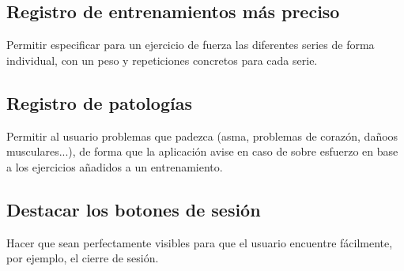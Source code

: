 \documentclass[a4paper]{article}
\begin{document}
	\subsection{Registro de entrenamientos más preciso}
	
	Permitir especificar para un ejercicio de fuerza las diferentes series de forma individual, con un peso y repeticiones concretos para cada serie.
	
	\subsection{Registro de patologías}
	
	Permitir al usuario problemas que padezca (asma, problemas de corazón, dañoos musculares...), de forma que la aplicación avise en caso de sobre esfuerzo en base a los ejercicios añadidos a un entrenamiento.
	
	\subsection{Destacar los botones de sesión}
	
	Hacer que sean perfectamente visibles para que el usuario encuentre fácilmente, por ejemplo, el cierre de sesión.
\end{document}
